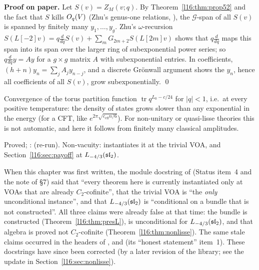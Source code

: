 \textbf{Proof on paper.} Let $S(v) = Z_M(v;q)$. By Theorem~\ref{l16:thm:prop52} and the fact that $S$ kills
$O_q(V)$ (Zhu's genus-one relations, ), the $\mathcal G$-span of all $S(v)$ is spanned by
finitely many $y_1,\dots,y_g$. Zhu's $\omega$-recursion $S(L[-2]v) = q\frac{d}{dq}S(v) +
\sum_{m}G_{2m+2}S(L[2m]v)$ shows that $q\frac{d}{dq}$ maps this span into its span over the larger ring of
subexponential power series; so $q\frac{d}{dq}y = Ay$ for a $g\times g$ matrix $A$ with subexponential entries. In
coefficients, $(h+n)y_n = \sum_j A_jy_{n-j}$, and a discrete Gr\"onwall argument shows the $y_n$, hence all
coefficients of all $S(v)$, grow subexponentially. \qed

\begin{physics}
Convergence of the torus partition function $\operatorname{tr}q^{L_0-c/24}$ for $|q|<1$, i.e.\ at every positive
temperature: the density of states grows slower than any exponential in the energy (for a CFT,
like $e^{2\pi\sqrt{c_{\mathrm{eff}}n/6}}$). For non-unitary or quasi-lisse theories this is not automatic, and here
it follows from finitely many classical amplitudes.
\end{physics}

\begin{status}
Proved; \allowbreak{}: \lean{[propext, Classical.}\allowbreak{}\allowbreak\lean{sound]} (re-run).
Non-vacuity: \allowbreak{}\allowbreak{} instantiates it at the trivial VOA, and Section~\ref{l16:sec:payoff}
at $L_{-4/3}(\mathfrak{sl}_2)$.
\end{status}

\begin{warning}[title={Stale ``no witness'' documentation (documentation only)}]
When this chapter was first written, the module docstring of  (Status item~4 and the note of \S7) said that ``every theorem
here is currently instantiated only at VOAs that are already $C_2$-cofinite'', that the trivial VOA is ``the
\emph{only} unconditional instance'', and that $L_{-4/3}(\mathfrak{sl}_2)$ is ``conditional on a
 bundle that is not constructed''. All three claims were already false at that time:
the bundle is constructed (Theorem~\ref{l16:thm:presL}),  is unconditional for
$L_{-4/3}(\mathfrak{sl}_2)$, and that algebra is proved not $C_2$-cofinite (Theorem~\ref{l16:thm:nonlisse}). The same stale
claims occurred in the headers of ,  and
 (its ``honest statement'' item~1). These docstrings have since been corrected (by a later revision of the library;
see the update in Section~\ref{l16:sec:nonlisse}).
\end{warning}

